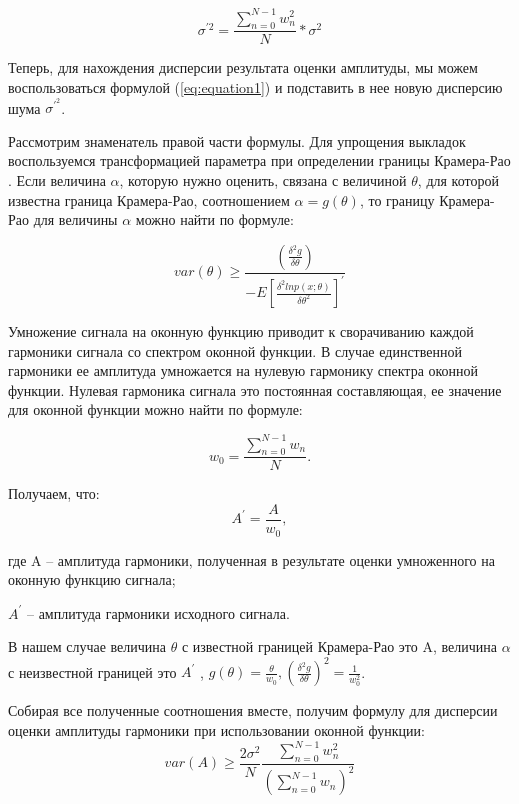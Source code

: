 \begin{equation}
	\label{eq:equation7}
	\sigma^{'2}=\frac{\sum_{n=0}^{N-1} w_n^2}{N}*\sigma^2
\end{equation}

Теперь, для нахождения дисперсии результата оценки амплитуды, мы можем воспользоваться формулой (\ref{eq:equation1}) и подставить в нее новую дисперсию шума $\sigma^{'^2}$.

Рассмотрим знаменатель правой части формулы. Для упрощения выкладок воспользуемся трансформацией параметра при определении границы Крамера-Рао \cite{kay1993fundamentals,kay2013fundamentals}. Если величина $\alpha$, которую нужно оценить, связана с величиной $\theta$, для которой известна граница Крамера-Рао, соотношением $\alpha=g(\theta)$, то границу Крамера-Рао для величины $\alpha$ можно найти по формуле: 

\begin{equation}
	\label{eq:equation8}
	var(\theta)\geq \frac{\left(\frac{\delta^2 g}{\delta\theta}\right)}{-E\left[\frac{\delta^2 ln p(x;\theta)}{\delta \theta^2}\right]^{'}}
\end{equation}

Умножение сигнала на оконную функцию приводит к сворачиванию каждой гармоники сигнала со спектром оконной функции. В случае единственной гармоники ее амплитуда умножается на нулевую гармонику спектра оконной функции. Нулевая гармоника сигнала это постоянная составляющая, ее значение для оконной функции можно найти по формуле: 

\begin{equation}
	\label{eq:equation9}
	w_0= \frac{\sum_{n=0}^{N-1} w_n}{N}.	  
\end{equation}

Получаем, что: 
\begin{equation}
	\label{eq:equation10}
	A^{'}=\frac{A}{w_0} ,		  
\end{equation}

где A -- амплитуда гармоники, полученная в результате оценки умноженного на оконную функцию сигнала; 

$A^{'}$ -- амплитуда гармоники исходного сигнала.

В нашем случае величина $\theta$ с известной границей Крамера-Рао это A, величина $\alpha$ с неизвестной границей это  $A^{'}$ , $g(\theta)=\frac{\theta}{w_0}, \left(\frac{\delta^2 g}{\delta \theta}\right)^2=\frac{1}{w_0^2}$.

Собирая все полученные соотношения вместе, получим формулу для дисперсии оценки амплитуды гармоники при использовании оконной функции: 
\begin{equation}
	\label{eq:equation11}
	var(A)\geq \frac{2\sigma^2}{N} \frac{\sum_{n=0}^{N-1}w_n^2}{\left(\sum_{n=0}^{N-1} w_n \right)^2} 			  
\end{equation}

